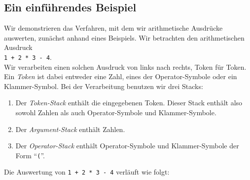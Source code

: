 \subsection{Ein einf\"uhrendes Beispiel}
Wir demonstrieren das Verfahren, mit dem wir arithmetische Ausdr\"ucke auswerten, zun\"achst
anhand eines Beispiels.
Wir betrachten den arithmetischen Ausdruck \\[0.1cm]
\hspace*{1.3cm} \texttt{1 + 2 * 3 - 4}. \\[0.1cm]
Wir verarbeiten einen solchen Ausdruck von links nach rechts, Token f\"ur Token.  Ein
\emph{Token} ist dabei entweder eine Zahl, eines der Operator-Symbole oder ein Klammer-Symbol.
Bei der Verarbeitung benutzen wir drei Stacks:
\begin{enumerate}
\item Der \emph{Token-Stack} enth\"alt die eingegebenen Token.  Dieser Stack enth\"alt also
      sowohl Zahlen als auch Operator-Symbole und Klammer-Symbole.
\item Der \emph{Argument-Stack} enth\"alt  Zahlen.
\item Der \emph{Operator-Stack} enth\"alt Operator-Symbole und 
      Klammer-Symbole der Form ``\texttt{(}''.
\end{enumerate}
Die Auswertung von \texttt{1 + 2 * 3 - 4} verl\"auft wie folgt:
